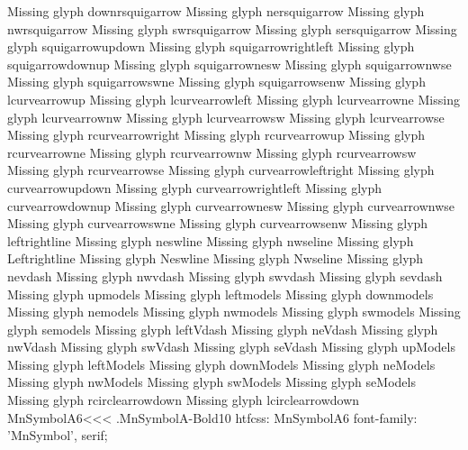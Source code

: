 Missing glyph	downrsquigarrow
Missing glyph	nersquigarrow
Missing glyph	nwrsquigarrow
Missing glyph	swrsquigarrow
Missing glyph	sersquigarrow
Missing glyph	squigarrowupdown
Missing glyph	squigarrowrightleft
Missing glyph	squigarrowdownup
Missing glyph	squigarrownesw
Missing glyph	squigarrownwse
Missing glyph	squigarrowswne
Missing glyph	squigarrowsenw
Missing glyph	lcurvearrowup
Missing glyph	lcurvearrowleft
Missing glyph	lcurvearrowne
Missing glyph	lcurvearrownw
Missing glyph	lcurvearrowsw
Missing glyph	lcurvearrowse
Missing glyph	rcurvearrowright
Missing glyph	rcurvearrowup
Missing glyph	rcurvearrowne
Missing glyph	rcurvearrownw
Missing glyph	rcurvearrowsw
Missing glyph	rcurvearrowse
Missing glyph	curvearrowleftright
Missing glyph	curvearrowupdown
Missing glyph	curvearrowrightleft
Missing glyph	curvearrowdownup
Missing glyph	curvearrownesw
Missing glyph	curvearrownwse
Missing glyph	curvearrowswne
Missing glyph	curvearrowsenw
Missing glyph	leftrightline
Missing glyph	neswline
Missing glyph	nwseline
Missing glyph	Leftrightline
Missing glyph	Neswline
Missing glyph	Nwseline
Missing glyph	nevdash
Missing glyph	nwvdash
Missing glyph	swvdash
Missing glyph	sevdash
Missing glyph	upmodels
Missing glyph	leftmodels
Missing glyph	downmodels
Missing glyph	nemodels
Missing glyph	nwmodels
Missing glyph	swmodels
Missing glyph	semodels
Missing glyph	leftVdash
Missing glyph	neVdash
Missing glyph	nwVdash
Missing glyph	swVdash
Missing glyph	seVdash
Missing glyph	upModels
Missing glyph	leftModels
Missing glyph	downModels
Missing glyph	neModels
Missing glyph	nwModels
Missing glyph	swModels
Missing glyph	seModels
Missing glyph	rcirclearrowdown
Missing glyph	lcirclearrowdown
\<MnSymbolA6\><<<
.MnSymbolA-Bold10
htfcss:  MnSymbolA6  font-family: 'MnSymbol', serif;

